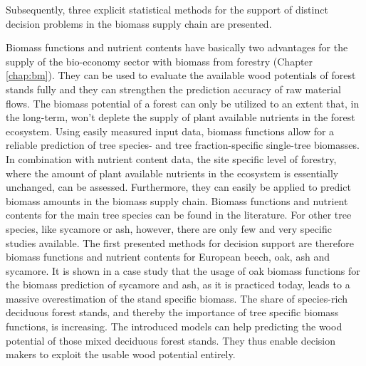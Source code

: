 Subsequently, three explicit statistical methods for the support of distinct decision problems in the biomass supply chain are presented.

Biomass functions and nutrient contents have basically two advantages for the supply of the bio-economy sector with biomass from forestry (Chapter \ref{chap:bm}). They can be used to evaluate the available wood potentials of forest stands fully and they can strengthen the prediction accuracy of raw material flows. The biomass potential of a forest can only be utilized to an extent that, in the long-term, won't deplete the supply of plant available nutrients in the forest ecosystem. Using easily measured input data, biomass functions allow for a reliable prediction of tree species- and tree fraction-specific single-tree biomasses. In combination with nutrient content data, the site specific level of forestry, where the amount of plant available nutrients in the ecosystem is essentially unchanged, can be assessed. Furthermore, they can easily be applied to predict biomass amounts in the biomass supply chain. Biomass functions and nutrient contents for the main tree species can be found in the literature. For other tree species, like sycamore or ash, however, there are only few and very specific studies available. The first presented methods for decision support are therefore biomass functions and nutrient contents for European beech, oak, ash and sycamore. It is shown in a case study that the usage of oak biomass functions for the biomass prediction of sycamore and ash, as it is practiced today, leads to a massive overestimation of the stand specific biomass. The share of species-rich deciduous forest stands, and thereby the importance of tree specific biomass functions, is increasing. The introduced models can help predicting the wood potential of those mixed deciduous forest stands. They thus enable decision makers to exploit the usable wood potential entirely.

